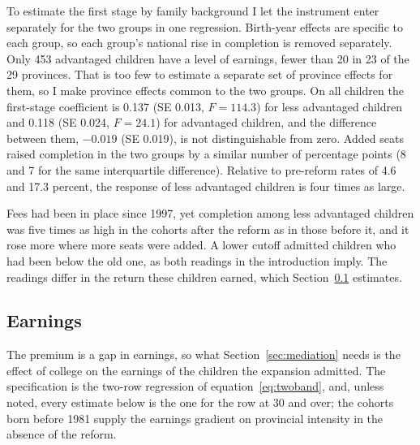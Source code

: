 \documentclass[11pt]{article}
\begin{document}
To estimate the first stage by family background I
let the instrument enter separately for the two groups in one
regression. Birth-year effects are specific to each group, so each
group's national rise in completion is removed separately. Only 453 advantaged children have a level of earnings, fewer than 20 in 23 of the 29 provinces. That is too few to
estimate a separate set of province effects for them, so I make province effects common to the two groups. On all
children the first-stage coefficient is 0.137 (SE 0.013,
$F = 114.3$) for less advantaged children and 0.118 (SE 0.024,
$F = 24.1$) for advantaged children, and the difference between them,
$-0.019$ (SE 0.019), is not distinguishable from zero. Added seats raised completion in the two groups by a similar number of percentage points (8 and 7 for the same interquartile difference). Relative to pre-reform rates of 4.6 and 17.3 percent, the response of less advantaged children is four times as large.

Fees had been in place since 1997, yet completion among less
advantaged children was five times as high in the cohorts after the reform as in those before it, and it rose more where more seats were added. A lower cutoff admitted children who had been below the old one, as both readings in the introduction imply. The readings differ in the return these children earned, which Section~\ref{sec:earnings} estimates.

\subsection{Earnings}
\label{sec:earnings}

The premium is a gap in earnings, so what Section~\ref{sec:mediation} needs is the effect of college on the earnings of the children the expansion admitted. The specification is the two-row regression of
equation~\eqref{eq:twoband}, and, unless noted, every estimate below is the one for the row at 30 and over; the cohorts born before 1981 supply the earnings
gradient on provincial intensity in the absence of the reform.
\end{document}
